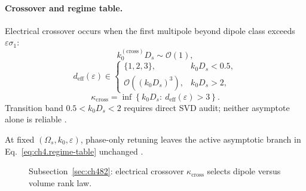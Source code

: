 \paragraph{Crossover and regime table.}
Electrical crossover occurs when the first multipole beyond dipole class exceeds \(\varepsilon\sigma_{1}\):
\begin{equation}
\label{eq:ch4.crossover-frequency}
k_{0}^{(\mathrm{cross})}D_{s}\sim\mathcal{O}(1),
\end{equation}
\begin{equation}
\label{eq:ch4.regime-table}
d_{\mathrm{eff}}(\varepsilon)\in\begin{cases}\{1,2,3\}, & k_{0}D_{s}<0.5,\\ \mathcal{O}((k_{0}D_{s})^{3}), & k_{0}D_{s}>2,\end{cases}
\end{equation}
\begin{equation}
\label{eq:ch4.crossover-knee}
\kappa_{\mathrm{cross}}=\inf\left\{k_{0}D_{s}:\ d_{\mathrm{eff}}(\varepsilon)>3\right\}.
\end{equation}
Transition band \(0.5<k_{0}D_{s}<2\) requires direct SVD audit; neither asymptote alone is reliable \cite{hansen1988,harrington2001,jackson1999}.

\begin{lemma}
\label{lem:ch4.phase-asymptote}
At fixed \((\Omega_{s},k_{0},\varepsilon)\), phase-only retuning leaves the active asymptotic branch in Eq.~\eqref{eq:ch4.regime-table} unchanged
\cite{devaney2004,harrington2001,stratton1941,hansen1988}.
\end{lemma}

\begin{figure}[t]
\centering
{}
\caption{Subsection~\ref{sec:ch482}: electrical crossover \(\kappa_{\mathrm{cross}}\) selects dipole versus volume rank law.}
\label{fig:ch4.asymptotic-crossover}
\end{figure}

